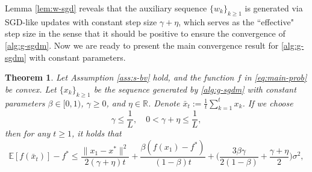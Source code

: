 \documentclass[10pt]{article}
\numberwithin{equation}{section}
\newtheorem{theorem}{Theorem}
\theoremstyle{definition}
\newcommand{\rbb}{\mathbb{R}}  %
\newcommand{\ebb}{\mathbb{E}}  %
\begin{document}
Lemma \ref{lem:w-sgd} reveals that the auxiliary sequence $\{w_k\}_{k\ge 1}$ is generated via SGD-like updates with constant step size $\gamma+\eta$, which serves as the ``effective" step size in the sense that it should be positive to ensure the convergence of \eqref{alg:g-sgdm}.
%
%
%
%
Now we are ready to present the main convergence result for \eqref{alg:g-sgdm} with constant parameters. 
\begin{theorem}\label{thm:cvx-const}
Let Assumption \ref{ass:s-bv} hold, and the function $f$ in \eqref{eq:main-prob} be convex. Let $\{x_k\}_{k\ge 1}$ be the sequence generated by \eqref{alg:g-sgdm} with constant parameters $\beta\in [0,1)$, $\gamma\ge 0$, and $\eta\in\rbb$. Denote $\bar{x}_t:=\frac{1}{t}\sum_{k=1}^t x_k$. If we choose
\[
\gamma\leq \frac{1}{L},\quad 0<\gamma+\eta\leq \frac{1}{L},
\]
then for any $t\ge 1$, it holds that
\[
\ebb[f(\bar{x}_t)]-f^* \leq \frac{\|x_1-x^*\|^2}{2(\gamma+\eta) t}+\frac{\beta (f(x_1)-f^*)}{(1-\beta) t}+\Big(\frac{3 \beta \gamma}{2(1-\beta)}+\frac{\gamma+\eta}{2}\Big) \sigma^2,
\]
\end{theorem}
\end{document}
